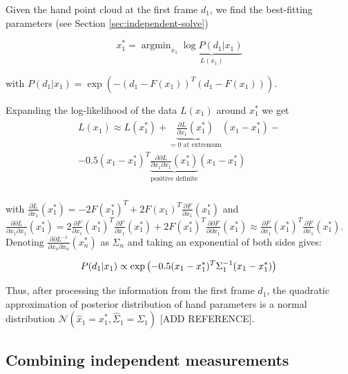 \documentclass[10pt,twocolumn,letterpaper]{article}
\begin{document}
Given the hand point cloud at the first frame $d_1$, we find the best-fitting parameters (see Section \ref{sec:independent-solve})

\begin{equation}
x^*_1 = \operatorname{argmin}_{x_1} \underbrace{\log  P(d_1|x_1)}_{L(x_1)} \label{eq:independent}
\end{equation}

with $P(d_1|x_1) = \exp \left( - (d_1 - F(x_1))^T (d_1 - F(x_1)) \right)$.

Expanding the log-likelihood of the data $L(x_1)$ around $x_1^*$ we get
\begin{align}
\begin{split}
 L(x_1) \approx L(x_1^*) + \underbrace{\frac{\partial L}{\partial x_1}(x_1^*)}_{= 0 \text{ at extremum}}(x_1 - x_1^*) - \\
- 0.5(x_1 - x_1^*)^T \underbrace{\frac{\partial \partial L}{\partial x_1 \partial x_1}(x_1^*) }_{\text{positive definite}}  (x_1 - x_1^*) \\
\end{split}
\end{align}

with $\frac{\partial L}{\partial x_1}(x_1^*) = - 2 F(x_1^*)^T + 2 F(x_1)^T \frac{\partial F}{\partial x_1}(x_1^*)  $ and 
$\frac{\partial \partial L}{\partial x_1 \partial x_1}(x_1^*) = 2  \frac{\partial F}{\partial x_1}(x_1^*)^T  \frac{\partial F}{\partial x_1}(x_1^*) + 2 F(x_1^*)^T  \frac{\partial \partial F}{\partial \partial x_1}(x_1^*)  \approx  \frac{\partial F}{\partial x_1}(x_1^*)^T  \frac{\partial F}{\partial x_1}(x_1^*)$. Denoting $\frac{\partial \partial L^{-1}}{\partial x_n \partial x_n}(x_n^*) $ as $\Sigma_n$ and taking an exponential of both sides gives:
\vspace{-2em}

\begin{equation}
P(d_1|x_1) \propto \exp\left(- 0.5(x_1 - x_1^*)^T \Sigma_1^{-1}  (x_1 - x_1^*) \right)\\
\end{equation}

Thus, after processing the information from the first frame $d_1$, the quadratic approximation of posterior distribution of hand parameters is a normal distribution $\mathcal{N}\left(\hat{x}_1 = x_1^*,  \hat{\Sigma}_1 = \Sigma_1 \right)$ [ADD REFERENCE].

\subsection {Combining independent measurements} \label{sec:combining}
\end{document}

